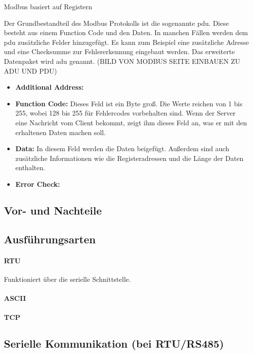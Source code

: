 Modbus basiert auf Registern 

Der Grundbestandteil des Modbus Protokolls ist die sogenannte \acf{pdu}. Diese besteht aus einem Function Code und den Daten. In manchen Fällen werden dem \acs{pdu} zusätzliche Felder hinzugefügt. Es kann zum Beispiel eine zusätzliche Adresse und eine Checksumme zur Fehlererkennung eingebaut werden. Das erweiterte Datenpaket wird \acf{adu} genannt.
(BILD VON MODBUS SEITE EINBAUEN ZU ADU UND PDU)
\begin{itemize}
	\item \textbf{Additional Address:}
	\item \textbf{Function Code:} Dieses Feld ist ein Byte groß. Die Werte reichen von 1 bis 255, wobei 128 bis 255 für Fehlercodes vorbehalten sind. Wenn der Server eine Nachricht vom Client bekommt, zeigt ihm dieses Feld an, was er mit den erhaltenen Daten machen soll. 
	\item \textbf{Data:} In diesem Feld werden die Daten beigefügt. Außerdem sind  auch zusätzliche Informationen wie die Registeradressen und die Länge der Daten enthalten.
	\item \textbf{Error Check:}
\end{itemize}


\cite{Modbus_Organization_AP:2012}

\subsection{Vor- und Nachteile}


\subsection{Ausführungsarten}
\paragraph{RTU}
Funktioniert über die serielle Schnittstelle.
\paragraph{ASCII}
\paragraph{TCP}

\subsection{Serielle Kommunikation (bei RTU/RS485)}


